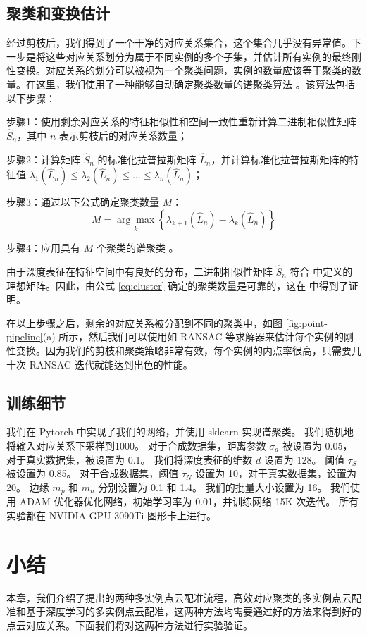 \subsection{聚类和变换估计}\label{sec:clusterandtransform}
经过剪枝后，我们得到了一个干净的对应关系集合，这个集合几乎没有异常值。下一步是将这些对应关系划分为属于不同实例的多个子集，并估计所有实例的最终刚性变换。对应关系的划分可以被视为一个聚类问题，实例的数量应该等于聚类的数量。在这里，我们使用了一种能够自动确定聚类数量的谱聚类算法 \cite{von2007tutorial,li2007noise}。该算法包括以下步骤：

步骤1：使用剩余对应关系的特征相似性和空间一致性重新计算二进制相似性矩阵 $\hat{S}_n$，其中 $n$ 表示剪枝后的对应关系数量；

步骤2：计算矩阵 $\hat{S}_n$ 的标准化拉普拉斯矩阵 $\hat{L}_n$，并计算标准化拉普拉斯矩阵的特征值 $\lambda_{1}\left(\hat{L}_{n}\right) \leq \lambda_{2}\left(\hat{L}_{n}\right) \leq \ldots \leq \lambda_{n}\left(\hat{L}_{n}\right)$；

步骤3：通过以下公式确定聚类数量 $M$：
\begin{equation}
  \label{eq:cluster}
  M=\underset{k}{\arg \max }\left\{\lambda_{k+1}\left(\hat{L}_{n}\right)-\lambda_{k}\left(\hat{L}_{n}\right)\right\}
\end{equation}

步骤4：应用具有 $M$ 个聚类的谱聚类 \cite{von2007tutorial}。

由于深度表征在特征空间中有良好的分布，二进制相似性矩阵 $\hat{S}_n$ 符合 \cite{li2007noise} 中定义的理想矩阵。因此，由公式 \ref{eq:cluster} 确定的聚类数量是可靠的，这在 \cite{li2007noise} 中得到了证明。

在以上步骤之后，剩余的对应关系被分配到不同的聚类中，如图 \ref{fig:point-pipeline}(a) 所示，然后我们可以使用如 RANSAC \cite{fischler1981random} 等求解器来估计每个实例的刚性变换。因为我们的剪枝和聚类策略非常有效，每个实例的内点率很高，只需要几十次 RANSAC 迭代就能达到出色的性能。

\subsection{训练细节}
我们在 Pytorch \cite{PyTorch} 中实现了我们的网络，并使用 sklearn \cite{Pedregosa2011Scikit} 实现谱聚类。
我们随机地将输入对应关系下采样到1000。
对于合成数据集，距离参数 $\sigma_d$ 被设置为 0.05，对于真实数据集，被设置为 0.1。
我们将深度表征的维数 $d$ 设置为 128。
阈值 $\tau_S$ 被设置为 0.85。
对于合成数据集，阈值 $\tau_N$ 设置为 10，对于真实数据集，设置为 20。
边缘 $m_p$ 和 $m_n$ 分别设置为 0.1 和 1.4。
我们的批量大小设置为 16。
我们使用 ADAM 优化器优化网络，初始学习率为 0.01，并训练网络 15K 次迭代。
所有实验都在 NVIDIA GPU 3090Ti 图形卡上进行。

\section{小结}
本章，我们介绍了提出的两种多实例点云配准流程，高效对应聚类的多实例点云配准和基于深度学习的多实例点云配准，这两种方法均需要通过好的方法来得到好的点云对应关系。下面我们将对这两种方法进行实验验证。